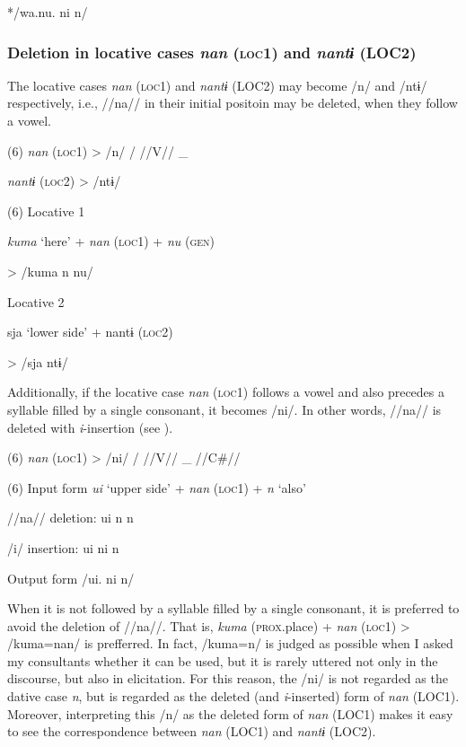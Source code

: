     */wa.nu.      ni      n/  

\subsubsection{Deletion in locative cases \textit{nan} (\textsc{loc}1) and \textit{nantɨ} (LOC2)}

The locative cases \textit{nan} (\textsc{loc}1) and \textit{nantɨ} (LOC2) may become /n/ and /ntɨ/ respectively, i.e., //na// in their initial positoin may be deleted, when they follow a vowel.

(6)  \textit{nan}  (\textsc{loc}1)  >  %
/n/    /  //V//  \_

  \textit{nantɨ}  (\textsc{loc}2)  >  /ntɨ/

(6) \ea Locative 1      \\
\gll

    \textit{kuma}  ‘here’  +  \textit{nan}  (\textsc{loc}1)  +  \textit{nu}  (\textsc{gen})

  >  /kuma      n      nu/  

 \ex Locative 2      \\
\gll

    sja  ‘lower side’  +  nantɨ  (\textsc{loc}2)

  >  /sja      ntɨ/        

Additionally, if the locative case \textit{nan} (\textsc{loc}1) follows a vowel and also precedes a syllable filled by a single consonant, it becomes /ni/. In other words, //na// is deleted with \textit{i}{}-insertion (see ).

(6)  \textit{nan}  (\textsc{loc}1)  >  /ni/  /  //V//  \_  //C\#//

(6)  Input form  \textit{ui}  ‘upper side’  +  \textit{nan}  (\textsc{loc}1)  +  \textit{n}  ‘also’

  //na// deletion:  ui      n      n  

  /i/ insertion:  ui      ni      n  

  Output form  /ui.      ni      n/  

When it is not followed by a syllable filled by a single consonant, it is preferred to avoid the deletion of //na//. That is, \textit{kuma} (\textsc{prox}.place) + \textit{nan} (\textsc{loc}1) > /kuma=nan/ is prefferred. In fact, /kuma=n/ is judged as possible when I asked my consultants whether it can be used, but it is rarely uttered not only in the discourse, but also in elicitation. For this reason, the /ni/ is not regarded as the dative case \textit{n}, but is regarded as the deleted (and \textit{i}{}-inserted) form of \textit{nan} (LOC1). Moreover, interpreting this /n/ as the deleted form of \textit{nan} (LOC1) makes it easy to see the correspondence between \textit{nan} (LOC1) and \textit{nantɨ} (LOC2).

